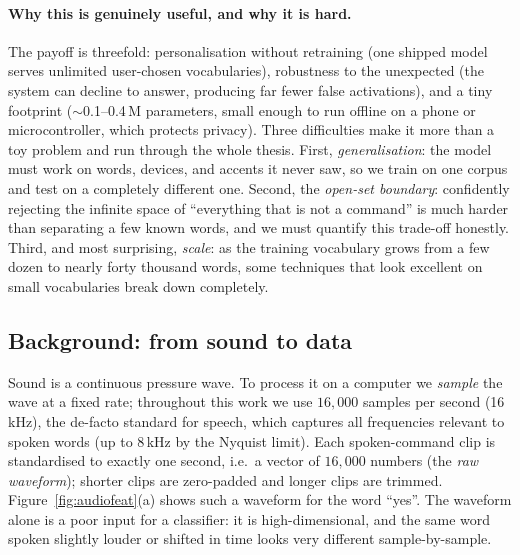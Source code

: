 \documentclass[12pt,a4paper]{article}
\begin{document}
\paragraph{Why this is genuinely useful, and why it is hard.}
The payoff is threefold: personalisation without retraining (one shipped model
serves unlimited user-chosen vocabularies), robustness to the unexpected (the
system can decline to answer, producing far fewer false activations), and a tiny
footprint ($\sim$0.1--0.4\,M parameters, small enough to run offline on a phone
or microcontroller, which protects privacy). Three difficulties make it more than
a toy problem and run through the whole thesis. First, \emph{generalisation}: the
model must work on words, devices, and accents it never saw, so we train on one
corpus and test on a completely different one. Second, the \emph{open-set
boundary}: confidently rejecting the infinite space of ``everything that is not a
command'' is much harder than separating a few known words, and we must quantify
this trade-off honestly. Third, and most surprising, \emph{scale}: as the
training vocabulary grows from a few dozen to nearly forty thousand words, some
techniques that look excellent on small vocabularies break down completely.

\subsection{Background: from sound to data}\label{sec:sound2data}

Sound is a continuous pressure wave. To process it on a computer we \emph{sample}
the wave at a fixed rate; throughout this work we use $16{,}000$ samples per
second (16\,kHz), the de-facto standard for speech, which captures all
frequencies relevant to spoken words (up to 8\,kHz by the Nyquist limit). Each
spoken-command clip is standardised to exactly one second, i.e.\ a vector of
$16{,}000$ numbers (the \emph{raw waveform}); shorter clips are zero-padded and
longer clips are trimmed. Figure~\ref{fig:audiofeat}(a) shows such a waveform for
the word ``yes''. The waveform alone is a poor input for a classifier: it is
high-dimensional, and the same word spoken slightly louder or shifted in time
looks very different sample-by-sample.
\end{document}
